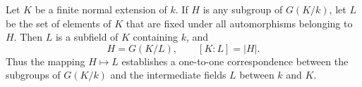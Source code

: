 Let $K$ be a finite normal extension of $k$. If $H$ is any subgroup of $G(K/k)$, let $L$ be the set of elements of $K$ that are fixed under all automorphisms belonging to $H$. Then $L$ is a subfield of $K$ containing $k$, and
\[
H = G(K/L), \qquad [K:L] = |H|.
\]
Thus the mapping $H \mapsto L$ establishes a one-to-one correspondence between the subgroups of $G(K/k)$ and the intermediate fields $L$ between $k$ and $K$.
